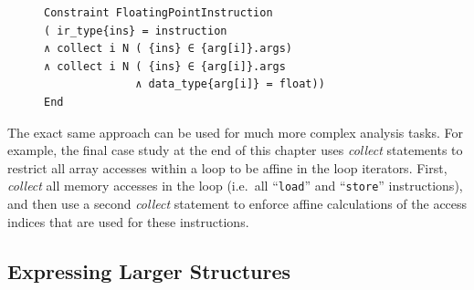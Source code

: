 \begin{figure}[H]
\begin{lstlisting}[language=CAnDL,label={fig:collectexample},caption=
   {{\it Collect} restricts ``{\tt ins}'' to be an instruction with only
    from floating-point operands.\leftskip=0pt\rightskip=0pt}]
Constraint FloatingPointInstruction
( ir_type{ins} = instruction
∧ collect i N ( {ins} ∈ {arg[i]}.args)
∧ collect i N ( {ins} ∈ {arg[i]}.args
              ∧ data_type{arg[i]} = float))
End
\end{lstlisting}
\end{figure}

    The exact same approach can be used for much more complex analysis tasks.
    For example, the final case study at the end of this chapter uses
    {\it collect} statements to restrict all array accesses within a
    loop to be affine in the loop iterators.
    First, {\it collect} all memory accesses in the loop
    (i.e.\ all ``{\tt load}'' and ``{\tt store}'' instructions), and then use a
    second {\it collect} statement to enforce affine calculations of the access
    indices that are used for these instructions.

\subsection{Expressing Larger Structures}

